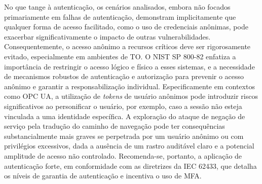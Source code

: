         No que tange à autenticação, os cenários analisados, embora não focados primariamente em falhas de autenticação, demonstram implicitamente que qualquer forma de acesso facilitado, como o uso de credenciais anônimas, pode exacerbar significativamente o impacto de outras vulnerabilidades. Consequentemente, o acesso anônimo a recursos críticos deve ser rigorosamente evitado, especialmente em ambientes de TO. O NIST SP 800-82 enfatiza a importância de restringir o acesso lógico e físico a esses sistemas, e a necessidade de mecanismos robustos de autenticação e autorização para prevenir o acesso anônimo e garantir a responsabilização individual. Especificamente em contextos como OPC UA, a utilização de \textit{tokens} de usuário anônimos pode introduzir riscos significativos ao personificar o usuário, por exemplo, caso a sessão não esteja vinculada a uma identidade específica. A exploração do ataque de negação de serviço pela tradução do caminho de navegação pode ter consequências substancialmente mais graves se perpetrada por um usuário anônimo ou com privilégios excessivos, dada a ausência de um rastro auditável claro e a potencial amplitude de acesso não controlado. Recomenda-se, portanto, a aplicação de autenticação forte, em conformidade com as diretrizes da IEC 62433, que detalha os níveis de garantia de autenticação e incentiva o uso de MFA.


